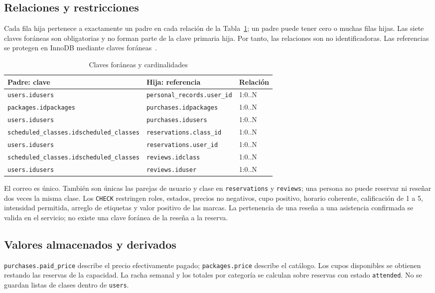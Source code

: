 \subsection{Relaciones y restricciones}
Cada fila hija pertenece a exactamente un padre en cada relación de la Tabla~\ref{tab:relaciones-laura}; un padre puede tener cero o muchas filas hijas. Las siete claves foráneas son obligatorias y no forman parte de la clave primaria hija. Por tanto, las relaciones son no identificadoras. Las referencias se protegen en InnoDB mediante claves foráneas~\cite{mysql-fk}.
\begin{table}[!t]\caption{Claves foráneas y cardinalidades}\label{tab:relaciones-laura}\centering\footnotesize
\begin{tabular}{p{}p{}p{}}\toprule
Padre: clave & Hija: referencia & Relación \\ \midrule
\texttt{users.idusers} & \texttt{personal\_\allowbreak{}records.user\_\allowbreak{}id} & 1:0..N \\
\texttt{packages.idpackages} & \texttt{purchases.idpackages} & 1:0..N \\
\texttt{users.idusers} & \texttt{purchases.idusers} & 1:0..N \\
\texttt{scheduled\_\allowbreak{}classes.idscheduled\_\allowbreak{}classes} & \texttt{reservations.class\_\allowbreak{}id} & 1:0..N \\
\texttt{users.idusers} & \texttt{reservations.user\_\allowbreak{}id} & 1:0..N \\
\texttt{scheduled\_\allowbreak{}classes.idscheduled\_\allowbreak{}classes} & \texttt{reviews.idclass} & 1:0..N \\
\texttt{users.idusers} & \texttt{reviews.iduser} & 1:0..N \\
\bottomrule\end{tabular}\end{table}
El correo es único. También son únicas las parejas de usuario y clase en \texttt{reservations} y \texttt{reviews}; una persona no puede reservar ni reseñar dos veces la misma clase. Los \texttt{CHECK} restringen roles, estados, precios no negativos, cupo positivo, horario coherente, calificación de 1 a 5, intensidad permitida, arreglo de etiquetas y valor positivo de las marcas. La pertenencia de una reseña a una asistencia confirmada se valida en el servicio; no existe una clave foránea de la reseña a la reserva.

\subsection{Valores almacenados y derivados}
\texttt{purchases.paid\_price} describe el precio efectivamente pagado; \texttt{packages.price} describe el catálogo. Los cupos disponibles se obtienen restando las reservas de la capacidad. La racha semanal y los totales por categoría se calculan sobre reservas con estado \texttt{attended}. No se guardan listas de clases dentro de \texttt{users}.

